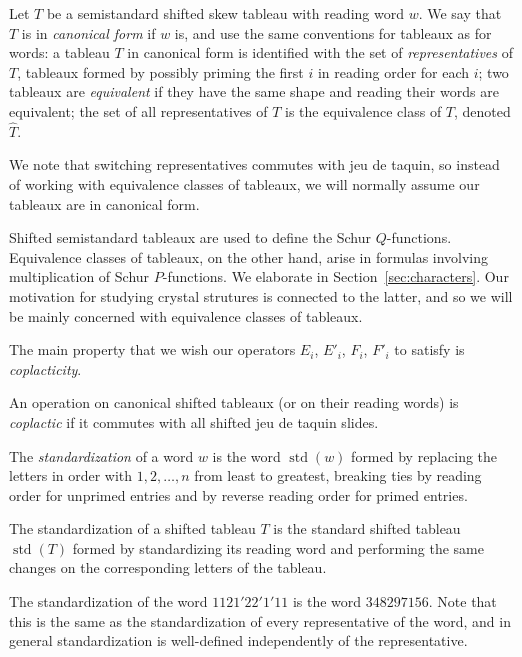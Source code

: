 \documentclass[ALCO,ThmDefs,Unicode,epreuves]{cedram}
\DeclareMathOperator{\std}{std}
\begin{document}
\begin{defi}
Let $T$ be a semistandard shifted skew tableau with reading word $w$. We say that $T$ is in \emph{canonical form} if $w$ is, and use the same conventions for tableaux as for words: a tableau $T$ in canonical form is identified with the set of \emph{representatives} of $T$, tableaux formed by possibly priming the first $i$ in reading order for each $i$; two tableaux are \emph{equivalent} if they have the same shape and reading their words are equivalent; the set of all representatives of $T$ is the equivalence class of $T$, denoted $\hat T$. 
\end{defi}

We note that switching representatives commutes with jeu de taquin, so instead of working with equivalence classes of tableaux, we will normally assume our tableaux are in canonical form. 

Shifted semistandard tableaux are used to define the Schur $Q$-functions. Equivalence classes of tableaux, on the other hand, arise in formulas involving multiplication of Schur $P$-functions. We elaborate in Section~\ref{sec:characters}. Our motivation for studying crystal strutures is connected to the latter, and so we will be mainly concerned with equivalence classes of tableaux. 

The main property that we wish our operators $E_i$, $E'_i$, $F_i$, $F'_i$ to satisfy is \emph{coplacticity}.

\begin{defi}
An operation on canonical shifted tableaux (or on their reading words) is \emph{coplactic} if it commutes with all shifted jeu de taquin slides.
\end{defi}

\begin{defi}
The \emph{standardization} of a word $w$ is the word $\std(w)$ formed by replacing the letters in order with $1,2,\ldots,n$ from least to greatest, breaking ties by reading order for unprimed entries and by reverse reading order for primed entries. 

The standardization of a shifted tableau $T$ is the standard shifted tableau $\std(T)$ formed by standardizing its reading word and performing the same changes on the corresponding letters of the tableau.
\end{defi}

\begin{exam}
The standardization of the word $1121'22'1'11$ is the word 
$348297156$. Note that this is the same as the standardization of every representative of the word, and in general standardization is well-defined independently of the representative.
\end{exam}
\end{document}
